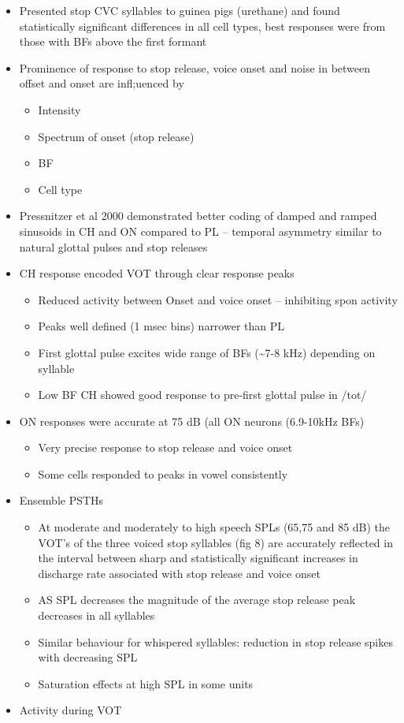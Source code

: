 \documentclass[10pt,a4paper]{article}
\begin{document}
\begin{itemize}
\item Presented stop CVC syllables to guinea pigs (urethane) and found
  statistically significant differences in all cell types, best responses were
  from those with BFs above the first formant
\item Prominence of response to stop release, voice onset and noise in between
  offset and onset are infl;uenced by

  \begin{itemize}
  \item Intensity
  \item Spectrum of onset (stop release)
  \item BF
  \item Cell type
  \end{itemize}
\item Pressnitzer et al 2000 demonstrated better coding of damped and ramped
  sinusoids in CH and ON compared to PL -- temporal asymmetry similar to natural
  glottal pulses and stop releases
\item CH response encoded VOT through clear response peaks

  \begin{itemize}
  \item Reduced activity between Onset and voice onset -- inhibiting spon
    activity
  \item Peaks well defined (1 msec bins) narrower than PL
  \item First glottal pulse excites wide range of BFs (\~{}7-8 kHz) depending on
    syllable
  \item Low BF CH showed good response to pre-first glottal pulse in /tot/
  \end{itemize}
\item ON responses were accurate at 75 dB (all ON neurons (6.9-10kHz BFs)

  \begin{itemize}
  \item Very precise response to stop release and voice onset
  \item Some cells responded to peaks in vowel consistently
  \end{itemize}
\item Ensemble PSTHs

  \begin{itemize}
  \item At moderate and moderately to high speech SPLs (65,75 and 85 dB) the
    VOT{\textquoteright}s of the three voiced stop syllables (fig 8) are
    accurately reflected in the interval between sharp and statistically
    significant increases in discharge rate associated with stop release and
    voice onset
  \item AS SPL decreases the magnitude of the average stop release peak
    decreases in all syllables
  \item Similar behaviour for whispered syllables: reduction in stop release
    spikes with decreasing SPL
  \item Saturation effects at high SPL in some units
  \end{itemize}
\item Activity during VOT


\end{itemize}
\end{document}
